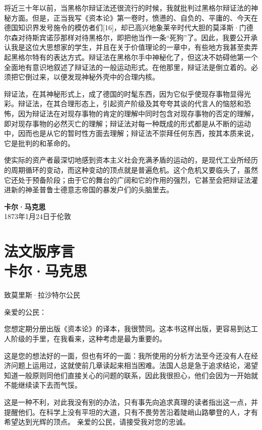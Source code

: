 \documentclass{ctexbook}
\begin{document}
将近三十年以前，当黑格尔辩证法还很流行的时候，我就批判过黑格尔辩证法的神秘方面。但是，正当我写《资本论》第一卷时，愤懑的、自负的、平庸的、今天在德国知识界发号施令的模仿者们[16]，却已高兴地象莱辛时代大胆的莫泽斯·门德尔森对待斯宾诺莎那样对待黑格尔，即把他当作一条“死狗”了。因此，我要公开承认我是这位大思想家的学生，并且在关于价值理论的一章中，有些地方我甚至卖弄起黑格尔特有的表达方式。辩证法在黑格尔手中神秘化了，但这决不妨碍他第一个全面地有意识地叙述了辩证法的一般运动形式。在他那里，辩证法是倒立着的。必须把它倒过来，以便发现神秘外壳中的合理内核。

辩证法，在其神秘形式上，成了德国的时髦东西，因为它似乎使现存事物显得光彩。辩证法，在其合理形态上，引起资产阶级及其夸夸其谈的代言人的恼怒和恐怖，因为辩证法在对现存事物的肯定的理解中同时包含对现存事物的否定的理解，即对现存事物的必然灭亡的理解；辩证法对每一种既成的形式都是从不断的运动中，因而也是从它的暂时性方面去理解；辩证法不崇拜任何东西，按其本质来说，它是批判的和革命的。

使实际的资产者最深切地感到资本主义社会充满矛盾的运动的，是现代工业所经历的周期循环的变动，而这种变动的顶点就是普遍危机。这个危机又要临头了，虽然它还处于预备阶段；由于它的舞台的广阔和它的作用的强烈，它甚至会把辩证法灌进新的神圣普鲁士德意志帝国的暴发户们的头脑里去。

\begin{flushright}
    \textbf{卡尔·马克思}\\
    \small{1873年1月24日于伦敦}
\end{flushright}






\chapter[卡尔·马克思\hspace{1em}法文版序言]{法文版序言\\{\small 卡尔·马克思}}

致莫里斯·拉沙特尔公民

亲爱的公民：

您想定期分册出版《资本论》的译本，我很赞同。这本书这样出版，更容易到达工人阶级的手里，在我看来，这种考虑是最为重要的。

这是您的想法好的一面，但也有坏的一面：我所使用的分析方法至今还没有人在经济问题上运用过，这就使前几章读起来相当困难。法国人总是急于追求结论，渴望知道一般原则同他们直接关心的问题的联系，因此我很担心，他们会因为一开始就不能继续读下去而气馁。

这是一种不利，对此我没有别的办法，只有事先向追求真理的读者指出这一点，并提醒他们。在科学上没有平坦的大道，只有不畏劳苦沿着陡峭山路攀登的人，才有希望达到光辉的顶点。
亲爱的公民，请接受我对您的忠诚。
\end{document}
